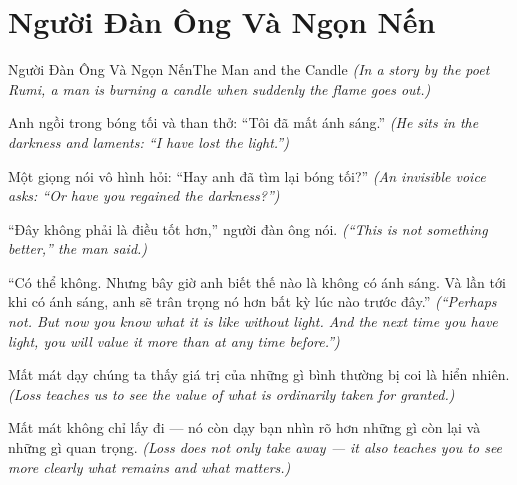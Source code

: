 \section{Người Đàn Ông Và Ngọn Nến}
\begin{truyen}{Người Đàn Ông Và Ngọn Nến}{The Man and the Candle}
\textit{(In a story by the poet Rumi, a man is burning a candle when suddenly the flame goes out.)}

Anh ngồi trong bóng tối và than thở: ``Tôi đã mất ánh sáng.''
\textit{(He sits in the darkness and laments: ``I have lost the light.'')}

Một giọng nói vô hình hỏi: ``Hay anh đã tìm lại bóng tối?''
\textit{(An invisible voice asks: ``Or have you regained the darkness?'')}

``Đây không phải là điều tốt hơn,'' người đàn ông nói.
\textit{(``This is not something better,'' the man said.)}

``Có thể không. Nhưng bây giờ anh biết thế nào là không có ánh sáng. Và lần tới khi có ánh sáng, anh sẽ trân trọng nó hơn bất kỳ lúc nào trước đây.''
\textit{(``Perhaps not. But now you know what it is like without light. And the next time you have light, you will value it more than at any time before.'')}

Mất mát dạy chúng ta thấy giá trị của những gì bình thường bị coi là hiển nhiên.
\textit{(Loss teaches us to see the value of what is ordinarily taken for granted.)}

\end{truyen}

\begin{baihoc}
Mất mát không chỉ lấy đi — nó còn dạy bạn nhìn rõ hơn những gì còn lại và những gì quan trọng.
\textit{(Loss does not only take away — it also teaches you to see more clearly what remains and what matters.)}
\end{baihoc}
\ngancach

